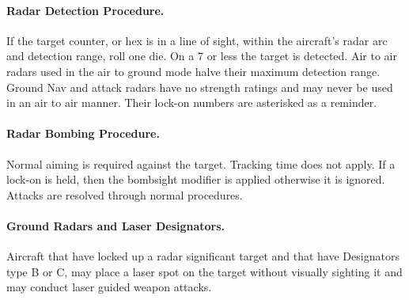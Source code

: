 \begin{advancedrules}
\paragraph{Radar Detection Procedure.} If the target counter, or hex is in a line of sight, within the aircraft's radar arc and detection range, roll one die. On a 7 or less the target is detected. Air to air radars used in the air to ground mode halve their maximum detection range. Ground Nav and attack radars have no strength ratings and may never be used in an air to air manner. Their lock-on numbers are asterisked as a reminder.

\paragraph{Radar Bombing Procedure.} Normal aiming is required against the target. Tracking time does not apply. If a lock-on is held, then the bombsight modifier is applied otherwise it is ignored. Attacks are resolved through normal procedures.

\paragraph{Ground Radars and Laser Designators.} Aircraft that have locked up a radar significant target and that have Designators type B or C, may place a laser spot on the target without visually sighting it and may conduct laser guided weapon attacks.


\end{advancedrules}

